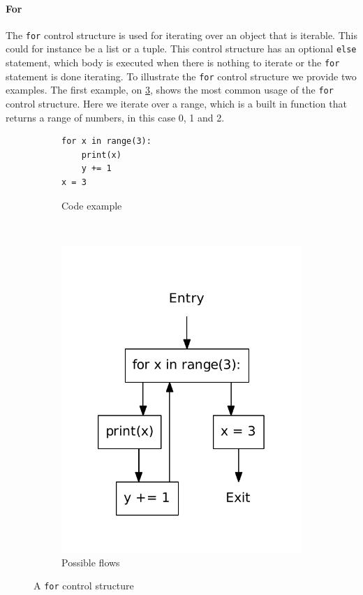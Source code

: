 \paragraph{For}
The \texttt{for} control structure is used for iterating over an object that is iterable.
This could for instance be a list or a tuple.
This control structure has an optional \texttt{else} statement, which body is executed when there is nothing to iterate or the \texttt{for} statement is done iterating.
To illustrate the \texttt{for} control structure we provide two examples.
The first example, on \cref{python:for}, shows the most common usage of the \texttt{for} control structure.
Here we iterate over a range, which is a built in function that returns a range of numbers, in this case 0, 1 and 2.

\begin{figure}[H]
  \centering
  \begin{subfigure}[b]{0.4\textwidth}
    \begin{lstlisting}[style=python]
for x in range(3):
    print(x)
    y += 1
x = 3
    \end{lstlisting}
    \caption{Code example}\label{python:for:code}
  \end{subfigure}
  ~ %
  \begin{subfigure}[b]{0.4\textwidth}
    \centering
    \includegraphics[scale=.5]{./figures/for.pdf}
    \caption{Possible flows}
    \label{python:for:flow}
  \end{subfigure}
  \caption{A \texttt{for} control structure}
  \label{python:for}
\end{figure}

